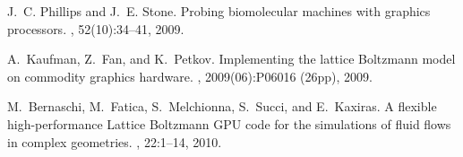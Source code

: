 \begin{thebibliography}{10}
J.~C. Phillips and J.~E. Stone.
\newblock Probing biomolecular machines with graphics processors.
, 52(10):34--41, 2009.

A.~Kaufman, Z.~Fan, and K.~Petkov.
\newblock Implementing the lattice {Boltzmann} model on commodity graphics
  hardware.
,
  2009(06):P06016 (26pp), 2009.

M.~Bernaschi, M.~Fatica, S.~Melchionna, S.~Succi, and E.~Kaxiras.
\newblock A flexible high-performance {Lattice Boltzmann GPU} code for the
  simulations of fluid flows in complex geometries.
, 22:1--14, 2010.

\end{thebibliography}
